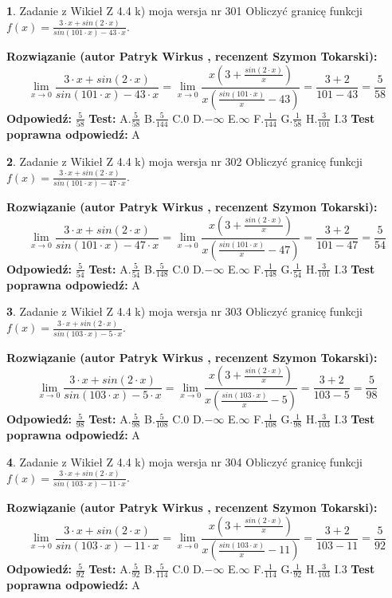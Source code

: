 \documentclass[12pt, a4paper]{article}
\theoremstyle{definition} %
\newtheorem{zad}{}
\newcommand{\zadStart}[1]{\begin{zad}#1\newline}
\newcommand{\zadStop}{\end{zad}}
\newcommand{\rozwStart}[2]{\noindent \textbf{Rozwiązanie (autor #1 , recenzent #2): }\newline}
\newcommand{\rozwStop}{\newline}
\newcommand{\odpStart}{\noindent \textbf{Odpowiedź:}\newline}
\newcommand{\odpStop}{\newline}
\newcommand{\testStart}{\noindent \textbf{Test:}\newline}
\newcommand{\testStop}{\newline}
\newcommand{\kluczStart}{\noindent \textbf{Test poprawna odpowiedź:}\newline}
\newcommand{\kluczStop}{\newline}
\begin{document}
\zadStart{Zadanie z Wikieł Z 4.4 k) moja wersja nr 301}
Obliczyć granicę funkcji $f(x)=\frac{3\cdot x +sin(2\cdot x)}{sin(101\cdot x) -43\cdot x}$.
\zadStop
\rozwStart{Patryk Wirkus}{Szymon Tokarski}
$$\lim\limits_{x\to 0}\frac{3\cdot x +sin(2\cdot x)}{sin(101\cdot x) -43\cdot x}
=\lim\limits_{x\to 0}\frac{x(3+\frac{sin(2\cdot x)}{x})}{x(\frac{sin(101\cdot x)}{x}-43)}
=\frac{3+2}{101-43} = \frac{5}{58}$$
\rozwStop
\odpStart
$\frac{5}{58}$
\odpStop
\testStart
A.$\frac{5}{58}$
B.$\frac{5}{144}$
C.$0$
D.$-\infty$
E.$\infty$
F.$\frac{1}{144}$
G.$\frac{1}{58}$
H.$\frac{3}{101}$
I.$3$
\testStop
\kluczStart
A
\kluczStop



\zadStart{Zadanie z Wikieł Z 4.4 k) moja wersja nr 302}
Obliczyć granicę funkcji $f(x)=\frac{3\cdot x +sin(2\cdot x)}{sin(101\cdot x) -47\cdot x}$.
\zadStop
\rozwStart{Patryk Wirkus}{Szymon Tokarski}
$$\lim\limits_{x\to 0}\frac{3\cdot x +sin(2\cdot x)}{sin(101\cdot x) -47\cdot x}
=\lim\limits_{x\to 0}\frac{x(3+\frac{sin(2\cdot x)}{x})}{x(\frac{sin(101\cdot x)}{x}-47)}
=\frac{3+2}{101-47} = \frac{5}{54}$$
\rozwStop
\odpStart
$\frac{5}{54}$
\odpStop
\testStart
A.$\frac{5}{54}$
B.$\frac{5}{148}$
C.$0$
D.$-\infty$
E.$\infty$
F.$\frac{1}{148}$
G.$\frac{1}{54}$
H.$\frac{3}{101}$
I.$3$
\testStop
\kluczStart
A
\kluczStop



\zadStart{Zadanie z Wikieł Z 4.4 k) moja wersja nr 303}
Obliczyć granicę funkcji $f(x)=\frac{3\cdot x +sin(2\cdot x)}{sin(103\cdot x) -5\cdot x}$.
\zadStop
\rozwStart{Patryk Wirkus}{Szymon Tokarski}
$$\lim\limits_{x\to 0}\frac{3\cdot x +sin(2\cdot x)}{sin(103\cdot x) -5\cdot x}
=\lim\limits_{x\to 0}\frac{x(3+\frac{sin(2\cdot x)}{x})}{x(\frac{sin(103\cdot x)}{x}-5)}
=\frac{3+2}{103-5} = \frac{5}{98}$$
\rozwStop
\odpStart
$\frac{5}{98}$
\odpStop
\testStart
A.$\frac{5}{98}$
B.$\frac{5}{108}$
C.$0$
D.$-\infty$
E.$\infty$
F.$\frac{1}{108}$
G.$\frac{1}{98}$
H.$\frac{3}{103}$
I.$3$
\testStop
\kluczStart
A
\kluczStop



\zadStart{Zadanie z Wikieł Z 4.4 k) moja wersja nr 304}
Obliczyć granicę funkcji $f(x)=\frac{3\cdot x +sin(2\cdot x)}{sin(103\cdot x) -11\cdot x}$.
\zadStop
\rozwStart{Patryk Wirkus}{Szymon Tokarski}
$$\lim\limits_{x\to 0}\frac{3\cdot x +sin(2\cdot x)}{sin(103\cdot x) -11\cdot x}
=\lim\limits_{x\to 0}\frac{x(3+\frac{sin(2\cdot x)}{x})}{x(\frac{sin(103\cdot x)}{x}-11)}
=\frac{3+2}{103-11} = \frac{5}{92}$$
\rozwStop
\odpStart
$\frac{5}{92}$
\odpStop
\testStart
A.$\frac{5}{92}$
B.$\frac{5}{114}$
C.$0$
D.$-\infty$
E.$\infty$
F.$\frac{1}{114}$
G.$\frac{1}{92}$
H.$\frac{3}{103}$
I.$3$
\testStop
\kluczStart
A
\kluczStop
\end{document}
